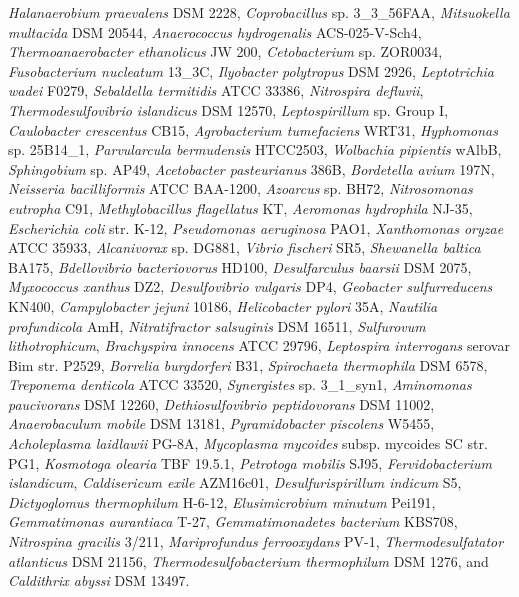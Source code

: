 \textit{Halanaerobium praevalens} DSM 2228,
\textit{Coprobacillus} sp. 3_3_56FAA,
\textit{Mitsuokella multacida} DSM 20544,
\textit{Anaerococcus hydrogenalis} ACS-025-V-Sch4,
\textit{Thermoanaerobacter ethanolicus} JW 200,
\textit{Cetobacterium} sp. ZOR0034,
\textit{Fusobacterium nucleatum} 13_3C,
\textit{Ilyobacter polytropus} DSM 2926,
\textit{Leptotrichia wadei} F0279,
\textit{Sebaldella termitidis} ATCC 33386,
\textit{Nitrospira defluvii},
\textit{Thermodesulfovibrio islandicus} DSM 12570,
\textit{Leptospirillum} sp. Group I,
\textit{Caulobacter crescentus} CB15,
\textit{Agrobacterium tumefaciens} WRT31,
\textit{Hyphomonas} sp. 25B14_1,
\textit{Parvularcula bermudensis} HTCC2503,
\textit{Wolbachia pipientis} wAlbB,
\textit{Sphingobium} sp. AP49,
\textit{Acetobacter pasteurianus} 386B,
\textit{Bordetella avium} 197N,
\textit{Neisseria bacilliformis} ATCC BAA-1200,
\textit{Azoarcus} sp. BH72,
\textit{Nitrosomonas eutropha} C91,
\textit{Methylobacillus flagellatus} KT,
\textit{Aeromonas hydrophila} NJ-35,
\textit{Escherichia coli} str. K-12,
\textit{Pseudomonas aeruginosa} PAO1,
\textit{Xanthomonas oryzae} ATCC 35933,
\textit{Alcanivorax} sp. DG881,
\textit{Vibrio fischeri} SR5,
\textit{Shewanella baltica} BA175,
\textit{Bdellovibrio bacteriovorus} HD100,
\textit{Desulfarculus baarsii} DSM 2075,
\textit{Myxococcus xanthus} DZ2,
\textit{Desulfovibrio vulgaris} DP4,
\textit{Geobacter sulfurreducens} KN400,
\textit{Campylobacter jejuni} 10186,
\textit{Helicobacter pylori} 35A,
\textit{Nautilia profundicola} AmH,
\textit{Nitratifractor salsuginis} DSM 16511,
\textit{Sulfurovum lithotrophicum},
\textit{Brachyspira innocens} ATCC 29796,
\textit{Leptospira interrogans} serovar Bim str. P2529,
\textit{Borrelia burgdorferi} B31,
\textit{Spirochaeta thermophila} DSM 6578,
\textit{Treponema denticola} ATCC 33520,
\textit{Synergistes} sp. 3_1_syn1,
\textit{Aminomonas paucivorans} DSM 12260,
\textit{Dethiosulfovibrio peptidovorans} DSM 11002,
\textit{Anaerobaculum mobile} DSM 13181,
\textit{Pyramidobacter piscolens} W5455,
\textit{Acholeplasma laidlawii} PG-8A,
\textit{Mycoplasma mycoides} subsp. mycoides SC str. PG1,
\textit{Kosmotoga olearia} TBF 19.5.1,
\textit{Petrotoga mobilis} SJ95,
\textit{Fervidobacterium islandicum},
\textit{Caldisericum exile} AZM16c01,
\textit{Desulfurispirillum indicum} S5,
\textit{Dictyoglomus thermophilum} H-6-12,
\textit{Elusimicrobium minutum} Pei191,
\textit{Gemmatimonas aurantiaca} T-27,
\textit{Gemmatimonadetes bacterium} KBS708,
\textit{Nitrospina gracilis} 3/211,
\textit{Mariprofundus ferrooxydans} PV-1,
\textit{Thermodesulfatator atlanticus} DSM 21156,
\textit{Thermodesulfobacterium thermophilum} DSM 1276, and
\textit{Caldithrix abyssi} DSM 13497.

